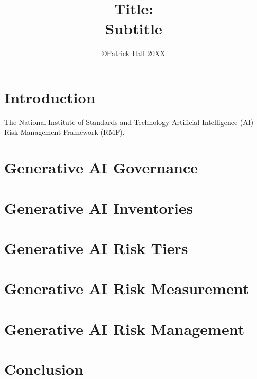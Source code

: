\documentclass[fleqn]{article}
\title{Title:\\\vspace{5pt}\normalsize{Subtitle}}
\author{\copyright Patrick Hall 20XX}
\begin{document}
\maketitle

\begin{abstract}
	
\end{abstract}

\section{Introduction} \label{sec:intro}

The National Institute of Standards and Technology Artificial Intelligence (AI) Risk Management Framework (RMF).\cite{airmf}

\section{Generative AI Governance}\label{sec:govern}


\section{Generative AI Inventories}\label{sec:inv}

\section{Generative AI Risk Tiers}\label{sec:tiers}

\section{Generative AI Risk Measurement}\label{sec:measure}

\section{Generative AI Risk Management}\label{sec:manage}

\section*{Conclusion}
\end{document}
